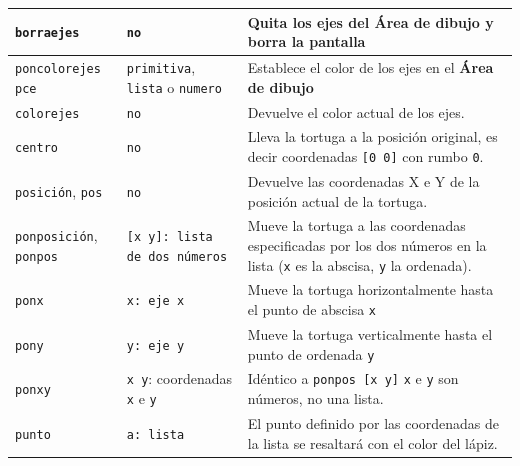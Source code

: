 \begin{center}
\begin{longtable}{|m{3.5cm}|m{3cm}|m{8.5cm}|}
   \texttt{borraejes}\index{borraejes@\texttt{borraejes}}
      & \texttt{no}  &
        Quita los ejes del \textbf{\'Area de dibujo} y borra la pantalla
            \\ \hline
   \texttt{poncolorejes}\index{poncolorejes@\texttt{poncolorejes}}
      \texttt{pce}\index{pce@\texttt{pce}} &
      \texttt{primitiva}, \texttt{lista} o \texttt{numero} &
        Establece el color de los ejes en el \textbf{\'Area de dibujo}
            \\ \hline
   \texttt{colorejes}\index{colorejes@\texttt{colorejes}} &
      \texttt{no} &
        Devuelve el color actual de los ejes. \\ \hline \hline
   \texttt{centro} \index{centro@\texttt{centro}} & \texttt{no} &
          Lleva la tortuga a la posici\'on original, es decir coordenadas
          \texttt{[0 0]} con rumbo \texttt{0}. \\ \hline 
   \texttt{posici\'on}, \index{posici\'on@\texttt{posici\'on}} 
      \texttt{pos} \index{pos@\texttt{pos}} & \texttt{no} &
        Devuelve las coordenadas X e Y de la posici\'on actual
        de la tortuga.\\ \hline 
   \texttt{ponposici\'on}, \index{ponposici\'on@\texttt{ponposici\'on}}
     \texttt{ponpos} \index{ponpos@\texttt{ponpos}} &
        \texttt{[x y]: lista de dos n\'umeros}&
          Mueve la tortuga a las coordenadas especificadas por los dos
          n\'umeros en la lista (\texttt{x} es la abscisa, \texttt{y} la
          ordenada). \\ \hline 
   \texttt{ponx} \index{ponx@\texttt{ponx}} & \texttt{x: eje x} &
          Mueve la tortuga horizontalmente hasta el punto de abscisa \texttt{x}
                 \\ \hline 
   \texttt{pony} \index{pony@\texttt{pony}} & \texttt{y: eje y} &
          Mueve la tortuga verticalmente hasta el punto de ordenada \texttt{y}
                  \\ \hline 
   \texttt{ponxy} \index{ponxy@\texttt{ponxy}} & 
       \texttt{x y}: coordenadas \texttt{x} e \texttt{y} &
          Id\'entico a \texttt{ponpos [x y]} \texttt{x} e \texttt{y} son
          n\'umeros, no una lista. \\ \hline 
   \texttt{punto} \index{punto@\texttt{punto}} & \texttt{a: lista} &
          El punto definido por las coordenadas de la lista se resaltar\'a
          con el color del l\'apiz. \\ \hline
\end{longtable} \end{center}


